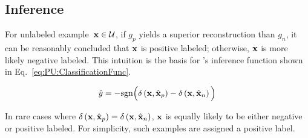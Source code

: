 \subsection{Inference}

For unlabeled example~${\mathbf{x}\in\mathcal{U}}$, if $g_{p}$ yields a superior reconstruction than $g_{n}$, it can be reasonably concluded that $\mathbf{x}$ is positive labeled; otherwise, $\mathbf{x}$ is more likely negative labeled.  This intuition is the basis for \toolname's inference function shown in Eq.~\eqref{eq:PU:ClassificationFunc}.

  \begin{equation}\label{eq:PU:ClassificationFunc}
    \hat{y} = -\text{sgn}\Big(\delta\left(\mathbf{x}, \hat{\mathbf{x}}_{p}\right) - \delta\left(\mathbf{x}, \hat{\mathbf{x}}_{n}\right)\Big)
  \end{equation}

\noindent
In rare cases where ${\delta\left(\mathbf{x}, \hat{\mathbf{x}}_{p}\right)=\delta\left(\mathbf{x}, \hat{\mathbf{x}}_{n}\right)}$, $\mathbf{x}$ is equally likely to be either negative or positive labeled.  For simplicity, such examples are assigned a positive label.


